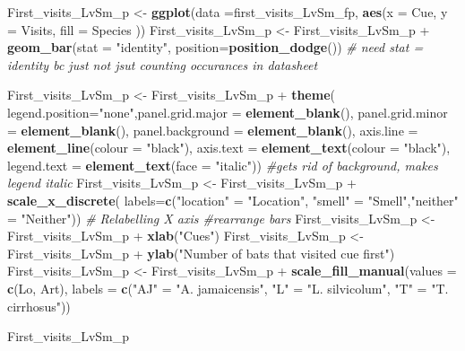 \documentclass[]{article}
\newenvironment{Shaded}{\begin{snugshade}}{\end{snugshade}}
\newcommand{\KeywordTok}[1]{\textcolor[rgb]{0.13,0.29,0.53}{\textbf{{#1}}}}
\newcommand{\DataTypeTok}[1]{\textcolor[rgb]{0.13,0.29,0.53}{{#1}}}
\newcommand{\StringTok}[1]{\textcolor[rgb]{0.31,0.60,0.02}{{#1}}}
\newcommand{\CommentTok}[1]{\textcolor[rgb]{0.56,0.35,0.01}{\textit{{#1}}}}
\newcommand{\NormalTok}[1]{{#1}}
\begin{document}
\begin{Shaded}
\begin{Highlighting}[]
\NormalTok{First_visits_LvSm_p <-}\StringTok{ }\KeywordTok{ggplot}\NormalTok{(}\DataTypeTok{data =}\NormalTok{first_visits_LvSm_fp, }\KeywordTok{aes}\NormalTok{(}\DataTypeTok{x =} \NormalTok{Cue, }\DataTypeTok{y =} \NormalTok{Visits, }\DataTypeTok{fill =} \NormalTok{Species ))}
\NormalTok{First_visits_LvSm_p <-}\StringTok{ }\NormalTok{First_visits_LvSm_p +}\StringTok{ }\KeywordTok{geom_bar}\NormalTok{(}\DataTypeTok{stat =} \StringTok{"identity"}\NormalTok{, }\DataTypeTok{position=}\KeywordTok{position_dodge}\NormalTok{()) }\CommentTok{# need stat = identity bc just not jsut counting occurances in datasheet}

\NormalTok{First_visits_LvSm_p  <-}\StringTok{ }\NormalTok{First_visits_LvSm_p  +}\StringTok{  }\KeywordTok{theme}\NormalTok{( }\DataTypeTok{legend.position=}\StringTok{"none"}\NormalTok{,}\DataTypeTok{panel.grid.major =} \KeywordTok{element_blank}\NormalTok{(), }\DataTypeTok{panel.grid.minor =} \KeywordTok{element_blank}\NormalTok{(),}
\DataTypeTok{panel.background =} \KeywordTok{element_blank}\NormalTok{(), }\DataTypeTok{axis.line =} \KeywordTok{element_line}\NormalTok{(}\DataTypeTok{colour =} \StringTok{"black"}\NormalTok{), }\DataTypeTok{axis.text =} \KeywordTok{element_text}\NormalTok{(}\DataTypeTok{colour =} \StringTok{"black"}\NormalTok{), }\DataTypeTok{legend.text =} \KeywordTok{element_text}\NormalTok{(}\DataTypeTok{face =} \StringTok{"italic"}\NormalTok{))  }\CommentTok{#gets rid of background, makes legend italic}
\NormalTok{First_visits_LvSm_p  <-}\StringTok{ }\NormalTok{First_visits_LvSm_p  +}\StringTok{ }\KeywordTok{scale_x_discrete}\NormalTok{( }\DataTypeTok{labels=}\KeywordTok{c}\NormalTok{(}\StringTok{"location"} \NormalTok{=}\StringTok{ "Location"}\NormalTok{, }\StringTok{"smell"} \NormalTok{=}\StringTok{ "Smell"}\NormalTok{,}\StringTok{"neither"} \NormalTok{=}\StringTok{ "Neither"}\NormalTok{))  }\CommentTok{# Relabelling X axis #rearrange bars}
\NormalTok{First_visits_LvSm_p  <-}\StringTok{ }\NormalTok{First_visits_LvSm_p  +}\StringTok{ }\KeywordTok{xlab}\NormalTok{(}\StringTok{"Cues"}\NormalTok{)}
\NormalTok{First_visits_LvSm_p  <-}\StringTok{ }\NormalTok{First_visits_LvSm_p  +}\StringTok{ }\KeywordTok{ylab}\NormalTok{(}\StringTok{"Number of bats that visited cue first"}\NormalTok{)}
\NormalTok{First_visits_LvSm_p  <-}\StringTok{ }\NormalTok{First_visits_LvSm_p  +}\StringTok{ }\KeywordTok{scale_fill_manual}\NormalTok{(}\DataTypeTok{values =} \KeywordTok{c}\NormalTok{(Lo, Art), }\DataTypeTok{labels =} \KeywordTok{c}\NormalTok{(}\StringTok{"AJ"} \NormalTok{=}\StringTok{ "A. jamaicensis"}\NormalTok{, }\StringTok{"L"} \NormalTok{=}\StringTok{ "L. silvicolum"}\NormalTok{, }\StringTok{"T"} \NormalTok{=}\StringTok{ "T. cirrhosus"}\NormalTok{))}

\NormalTok{First_visits_LvSm_p}
\end{Highlighting}
\end{Shaded}
\end{document}
